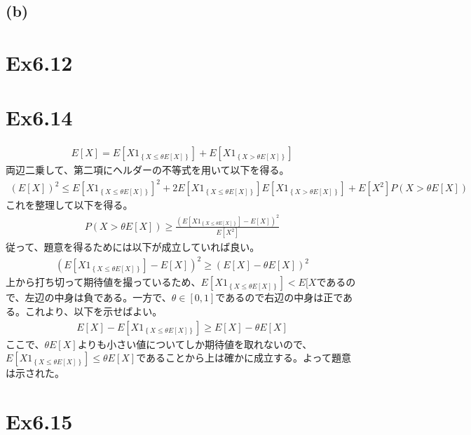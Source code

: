 \documentclass{article}
\begin{document}
\subsection{(b)}


\section{Ex6.12}

\section{Ex6.14}
\begin{align*}
	E[X] = E\left[ X 1_{\left\{ X \leq \theta E[X] \right\}} \right] + E\left[ X 1_{\left\{ X > \theta E[X] \right\}} \right]
\end{align*}
両辺二乗して、第二項にヘルダーの不等式を用いて以下を得る。
\begin{align*}
	\left( E[X] \right)^2 \leq E\left[ X 1_{\left\{ X \leq \theta E[X] \right\}} \right]^2 + 2 E\left[ X 1_{\left\{ X \leq \theta E[X] \right\}} \right] E\left[ X 1_{\left\{ X > \theta E[X] \right\}} \right] + E[X^2] P\left( X > \theta E[X] \right)
\end{align*}
これを整理して以下を得る。
\begin{align*}
	P\left( X > \theta E[X] \right) \geq \frac{\left( E\left[ X 1_{\left\{ X \leq \theta E[X] \right\}} \right] - E[X] \right)^2}{E[X^2]}
\end{align*}
従って、題意を得るためには以下が成立していれば良い。
\begin{align*}
	\left( E\left[ X 1_{\left\{ X \leq \theta E[X] \right\}} \right] - E[X] \right)^2 \geq \left( E[X] - \theta E[X] \right)^2
\end{align*}
上から打ち切って期待値を撮っているため、$E\left[ X 1_{\left\{ X \leq \theta E[X] \right\}} \right] < E[X$であるので、左辺の中身は負である。一方で、$\theta \in [0,1]$であるので右辺の中身は正である。これより、以下を示せばよい。
\begin{align*}
	E[X] - E\left[ X 1_{\left\{ X \leq \theta E[X] \right\}} \right]  \geq E[X] - \theta E[X] 
\end{align*}
ここで、$\theta E[X]$よりも小さい値についてしか期待値を取れないので、$E\left[ X 1_{\left\{ X \leq \theta E[X] \right\}} \right] \leq \theta E[X]$であることから上は確かに成立する。よって題意は示された。

\section{Ex6.15}
\end{document}
